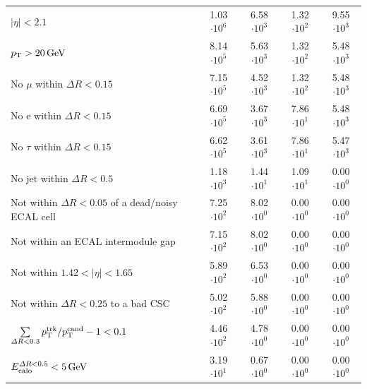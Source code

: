 \begin{table}[!h]
{\begin{tabular}{|l|c|c|c|c|}
$|\eta|<2.1$                                                                              & 1.03 $\cdot10^{6 }$ & 6.58 $\cdot10^{3 }$ & 1.32 $\cdot10^{2 }$ & 9.55 $\cdot10^{3 }$ \\
$p_{\text{T}}>20\,\text{Ge}\kern-0.06667em\text{V}$                                                                              & 8.14 $\cdot10^{5 }$ & 5.63 $\cdot10^{3 }$ & 1.32 $\cdot10^{2 }$ & 5.48 $\cdot10^{3 }$ \\
No $\mu$ within $\Delta R<0.15$                                                           & 7.15 $\cdot10^{5 }$ & 4.52 $\cdot10^{3 }$ & 1.32 $\cdot10^{2 }$ & 5.48 $\cdot10^{3 }$ \\
No e within $\Delta R<0.15$                                                               & 6.69 $\cdot10^{5 }$ & 3.67 $\cdot10^{3 }$ & 7.86 $\cdot10^{1 }$ & 5.48 $\cdot10^{3 }$ \\
No $\tau$ within $\Delta R<0.15$                                                          & 6.62 $\cdot10^{5 }$ & 3.61 $\cdot10^{3 }$ & 7.86 $\cdot10^{1 }$ & 5.47 $\cdot10^{3 }$ \\
No jet within $\Delta R<0.5$                                                              & 1.18 $\cdot10^{3 }$ & 1.44 $\cdot10^{1 }$ & 1.09 $\cdot10^{1 }$ & 0.00 $\cdot10^{0 }$ \\
\makecell[l]{Not within $\Delta R<0.05$ of \\\hfill a dead/noisy ECAL cell}               & 7.25 $\cdot10^{2 }$ & 8.02 $\cdot10^{0 }$ & 0.00 $\cdot10^{0 }$ & 0.00 $\cdot10^{0 }$ \\
Not within an ECAL  intermodule gap                                                       & 7.15 $\cdot10^{2 }$ & 8.02 $\cdot10^{0 }$ & 0.00 $\cdot10^{0 }$ & 0.00 $\cdot10^{0 }$ \\
Not within $1.42<|\eta|<1.65$                                                             & 5.89 $\cdot10^{2 }$ & 6.53 $\cdot10^{0 }$ & 0.00 $\cdot10^{0 }$ & 0.00 $\cdot10^{0 }$ \\
Not within $\Delta R<0.25$ to a bad CSC                                                   & 5.02 $\cdot10^{2 }$ & 5.88 $\cdot10^{0 }$ & 0.00 $\cdot10^{0 }$ & 0.00 $\cdot10^{0 }$ \\
$\sum \limits_{\Delta R < 0.3} p_{\text{T}}^{\text{trk}}/p_{\text{T}}^{\text{cand}} -1 < 0.1$                         & 4.46 $\cdot10^{2 }$ & 4.78 $\cdot10^{0 }$ & 0.00 $\cdot10^{0 }$ & 0.00 $\cdot10^{0 }$ \\
$E^{\Delta R<0.5}_{\text{calo}}<5\,\text{Ge}\kern-0.06667em\text{V}$                                                                            & 3.19 $\cdot10^{1 }$ & 0.67 $\cdot10^{0 }$ & 0.00 $\cdot10^{0 }$ & 0.00 $\cdot10^{0 }$ \\
\bottomrule
\end{tabular}}
\end{table}  

